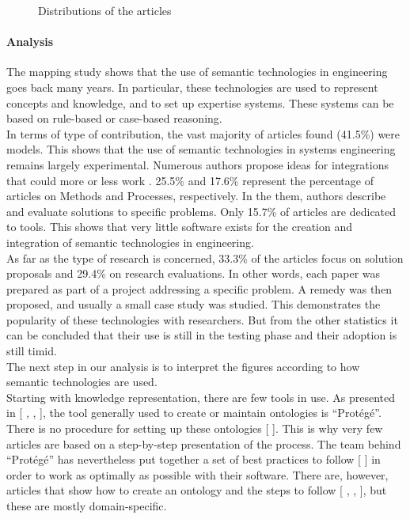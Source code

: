 \begin{figure}[h]
\begin{subfigure}[b]{0.45\textwidth}
                \end{subfigure}
                \caption{\label{fig:distro-art} Distributions of the articles}
            \end{figure}
            
            \paragraph{Analysis\label{para:sms_analysis}}
            The mapping study shows that the use of semantic technologies in engineering goes back many years. In particular, these technologies are used to represent concepts and knowledge, and to set up expertise systems. These systems can be based on rule-based or case-based reasoning.\\
            
            In terms of type of contribution, the vast majority of articles found (41.5\%) were models. This shows that the use of semantic technologies in systems engineering remains largely experimental. Numerous authors propose ideas for integrations that could more or less work \cite{benjamin2007using, tofani2010using, benjamin2006using, bouza2008semtree}. 25.5\% and 17.6\% represent the percentage of articles on Methods and Processes, respectively. In the them, authors describe and evaluate solutions to specific problems. Only 15.7\% of articles are dedicated to tools. This shows that very little software exists for the creation and integration of semantic technologies in engineering.\\
            As far as the type of research is concerned, 33.3\% of the articles focus on solution proposals and 29.4\% on research evaluations. In other words, each paper was prepared as part of a project addressing a specific problem. A remedy was then proposed, and usually a small case study was studied. This demonstrates the popularity of these technologies with researchers. But from the other statistics it can be concluded that their use is still in the testing phase and their adoption is still timid.\\

            The next step in our analysis is to interpret the figures according to how semantic technologies are used.\\
            Starting with knowledge representation, there are few tools in use. As presented in [ , , ], the tool generally used to create or maintain ontologies is “Protégé”. There is no procedure for setting up these ontologies [ ]. This is why very few articles are based on a step-by-step presentation of the process. The team behind “Protégé” has nevertheless put together a set of best practices to follow [ ] in order to work as optimally as possible with their software. There are, however, articles that show how to create an ontology and the steps to follow [ , , ], but these are mostly domain-specific. \\

